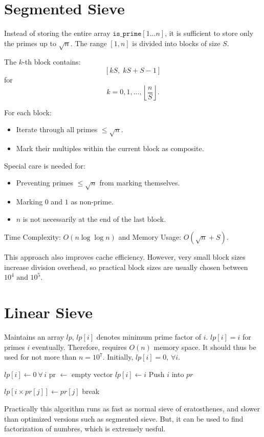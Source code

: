 \documentclass{article}
\begin{document}
	\section{Segmented Sieve}
	Instead of storing the entire array $\texttt{is\_prime}[1 \dots n]$, it is sufficient to store only the primes up to $\sqrt{n}$. The range $[1,n]$ is divided into blocks of size $S$.
	
	The $k$-th block contains:
	\[
	[kS,\; kS + S - 1]
	\]
	for
	\[
	k = 0,1,\dots,\left\lfloor \frac{n}{S} \right\rfloor.
	\]
	
	For each block:
	\begin{itemize}
		\item Iterate through all primes $\le \sqrt{n}$.
		\item Mark their multiples within the current block as composite.
	\end{itemize}
	
	Special care is needed for:
	\begin{itemize}
		\item Preventing primes $\le \sqrt{n}$ from marking themselves.
		\item Marking $0$ and $1$ as non-prime.
		\item $n$ is not necessarily at the end of the last block.
	\end{itemize}
	
	Time Complexity: $O(n \log\log n)$ and Memory Usage: $O(\sqrt{n} + S).$ \newline
	
	This approach also improves cache efficiency. However, very small block sizes increase division overhead, so practical block sizes are usually chosen between $10^4 \text{ and } 10^5.$
	
	\section{Linear Sieve}
	Maintains an array $lp$, $lp[i]$ denotes minimum prime factor of $i$. $lp[i] = i$ for primes $i$ eventually.
	Therefore, requires $O(n)$ memory space. It should thus be used for not more than $n = 10^7$.
	Initially, $lp[i] = 0, \, \forall i$. \vspace{2mm}
	
	\begin{algorithm}[H]
		\SetAlgoLined
		\caption{Algorithm}
		$lp[i] \leftarrow 0 \: \forall \, i$ \;
		pr $\leftarrow$ empty vector \;
		 {
		 	{
		 		$lp[i] \leftarrow i$ \;
		 		Push $i$ into $pr$ \;
		 	}
		 }
		 
		 {
		 	$lp[i \times pr[j]] \leftarrow pr[j] $\;
		 	{
		 		break \;
		 	}
		 }
	\end{algorithm}
	\vspace{2mm}
	
	Practically this algorithm runs as fast as normal sieve of eratosthenes, and slower than optimized versions such as segmented sieve. But, it can be used to find factorization of numbres, which is extremely uesful.
\end{document}
